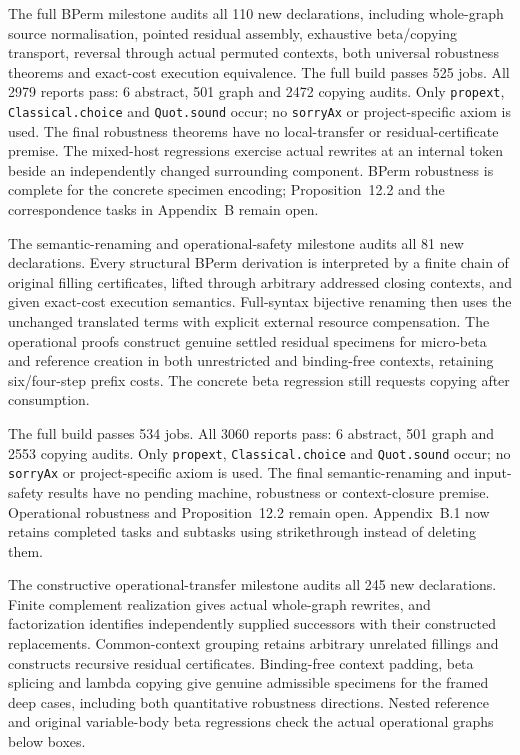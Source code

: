 The full BPerm milestone audits all 110 new declarations, including whole-graph
source normalisation, pointed residual assembly, exhaustive beta/copying
transport, reversal through actual permuted contexts, both universal robustness
theorems and exact-cost execution equivalence. The full build passes 525 jobs.
All 2979 reports pass: 6 abstract, 501 graph and 2472 copying audits. Only
\texttt{propext}, \texttt{Classical.choice} and \texttt{Quot.sound} occur;
no \texttt{sorryAx} or project-specific axiom is used. The final robustness
theorems have no local-transfer or residual-certificate premise. The mixed-host
regressions exercise actual rewrites at an internal token beside an independently
changed surrounding component. BPerm robustness is complete for the concrete
specimen encoding; Proposition~12.2 and the correspondence tasks in Appendix~B
remain open.


The semantic-renaming and operational-safety milestone audits all 81 new
declarations. Every structural BPerm derivation is interpreted by a finite
chain of original filling certificates, lifted through arbitrary addressed
closing contexts, and given exact-cost execution semantics. Full-syntax
bijective renaming then uses the unchanged translated terms with explicit
external resource compensation. The operational proofs construct genuine
settled residual specimens for micro-beta and reference creation in both
unrestricted and binding-free contexts, retaining six/four-step prefix costs.
The concrete beta regression still requests copying after consumption.

The full build passes 534 jobs. All 3060 reports pass: 6 abstract, 501 graph
and 2553 copying audits. Only \texttt{propext}, \texttt{Classical.choice} and
\texttt{Quot.sound} occur; no \texttt{sorryAx} or project-specific axiom is
used. The final semantic-renaming and input-safety results have no pending
machine, robustness or context-closure premise. Operational robustness and
Proposition~12.2 remain open. Appendix~B.1 now retains completed tasks and
subtasks using strikethrough instead of deleting them.


The constructive operational-transfer milestone audits all 245 new declarations.
Finite complement realization gives actual whole-graph rewrites, and
factorization identifies independently supplied successors with their
constructed replacements. Common-context grouping retains arbitrary unrelated
fillings and constructs recursive residual certificates. Binding-free context
padding, beta splicing and lambda copying give genuine admissible specimens
for the framed deep cases, including both quantitative robustness directions.
Nested reference and original variable-body beta regressions check the actual
operational graphs below boxes.

